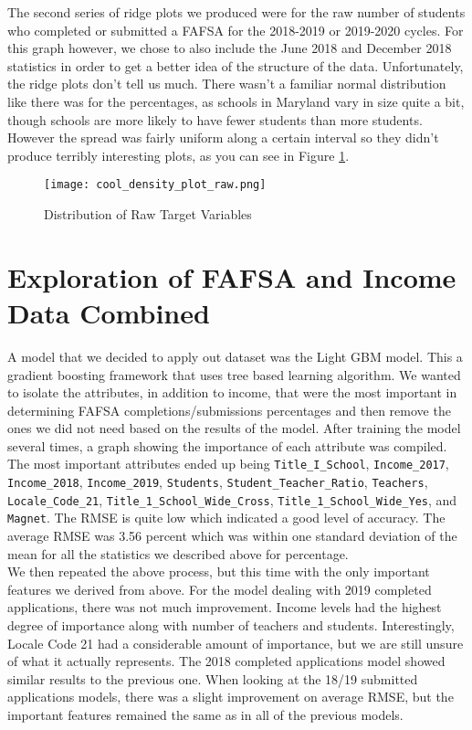 \documentclass[12pt]{article}
\begin{document}
The second series of ridge plots we produced were for the raw number of students
who completed or submitted a FAFSA for the 2018-2019 or 2019-2020 cycles. For this
graph however, we chose to also include the June 2018 and December 2018 statistics
in order to get a better idea of the structure of the data. Unfortunately, the ridge
plots don't tell us much. There wasn't a familiar normal distribution like there was
for the percentages, as schools in Maryland vary in size quite a bit, though schools
are more likely to have fewer students than more students. However the spread was
fairly uniform along a certain interval so they didn't produce terribly interesting
plots, as you can see in Figure \ref{fig:target_raw}.

\begin{figure}[!htb]
  \centering
  \texttt{[image: cool\_density\_plot\_raw.png]}
  \caption{Distribution of Raw Target Variables}
  \label{fig:target_raw}
\end{figure}

\section{Exploration of FAFSA and Income Data Combined}
A model that we decided to apply out dataset was the Light GBM model. This a 
gradient boosting framework that uses tree based learning algorithm. We wanted 
to isolate the attributes, in addition to income, that were the most important 
in determining FAFSA completions/submissions percentages and then remove the ones 
we did not need based on the results of the model. After training the model several 
times, a graph showing the importance of each attribute was compiled. The most 
important attributes ended up being \texttt{Title\_I\_School}, \texttt{Income\_2017},
\texttt{Income\_2018}, \texttt{Income\_2019}, \texttt{Students},
\texttt{Student\_Teacher\_Ratio}, \texttt{Teachers}, \texttt{Locale\_Code\_21},
\texttt{Title\_1\_School\_Wide\_Cross}, \texttt{Title\_1\_School\_Wide\_Yes}, 
and \texttt{Magnet}. The RMSE is quite low which indicated a good level of 
accuracy. The average RMSE was 3.56 percent which was within one standard 
deviation of the mean for all the statistics we described above for 
percentage.\\

We then repeated the above process, but this time with the only important 
features we derived from above. For the model dealing with 2019 completed 
applications, there was not much improvement. Income levels had the highest 
degree of importance along with number of teachers and students. Interestingly, 
Locale Code 21 had a considerable amount of importance, but we are still unsure 
of what it actually represents. The 2018 completed applications model showed 
similar results to the previous one. When looking at the 18/19 submitted 
applications models, there was a slight improvement on average RMSE, but the 
important features remained the same as in all of the previous models.\\
\end{document}
